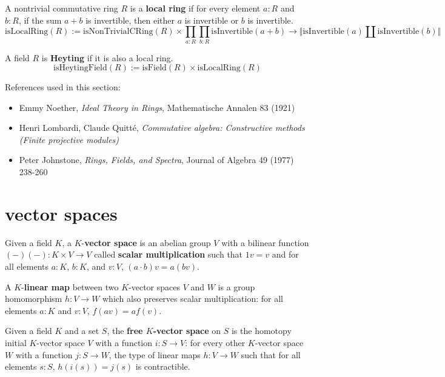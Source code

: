 \begin{definition}
A nontrivial commutative ring $R$ is a \textbf{local ring} if for every element $a:R$ and $b:R$, if the sum $a + b$ is invertible, then either $a$ is invertible or $b$ is invertible. 
$$\mathrm{isLocalRing}(R) := \mathrm{isNonTrivialCRing}(R) \times \prod_{a:R} \prod_{b:R} \mathrm{isInvertible}(a + b) \to \Vert\mathrm{isInvertible}(a) \amalg \mathrm{isInvertible}(b)\Vert$$ 
\end{definition}

\begin{definition}
A field $R$ is \textbf{Heyting} if it is also a local ring. 
$$\mathrm{isHeytingField}(R) := \mathrm{isField}(R) \times \mathrm{isLocalRing}(R)$$ 
\end{definition}

References used in this section: 
\begin{itemize}
\item Emmy Noether, \textit{Ideal Theory in Rings}, Mathematische Annalen 83 (1921)
\item Henri Lombardi, Claude Quitté, \textit{Commutative algebra: Constructive methods (Finite projective modules)}
\item Peter Johnstone, \textit{Rings, Fields, and Spectra}, Journal of Algebra 49 (1977) 238-260
\end{itemize}

\section{vector spaces}

\begin{definition}
Given a field $K$, a $K$-\textbf{vector space} is an abelian group $V$ with a bilinear function $(-)(-):K \times V \to V$ called \textbf{scalar multiplication} such that $1 v = v$ and for all elements $a:K$, $b:K$, and $v:V$, $(a \cdot b) v = a (b v)$. 
\end{definition}

\begin{definition}
A $K$-\textbf{linear map} between two $K$-vector spaces $V$ and $W$ is a group homomorphism $h:V \to W$ which also preserves scalar multiplication: for all elements $a:K$ and $v:V$, $f(a v) = a f(v)$. 
\end{definition}

\begin{definition}
Given a field $K$ and a set $S$, the \textbf{free $K$-vector space} on $S$ is the homotopy initial $K$-vector space $V$ with a function $i:S \to V$: for every other $K$-vector space $W$ with a function $j:S \to W$, the type of linear maps $h:V \to W$ such that for all elements $s:S$, $h(i(s)) = j(s)$ is contractible. 
\end{definition}

